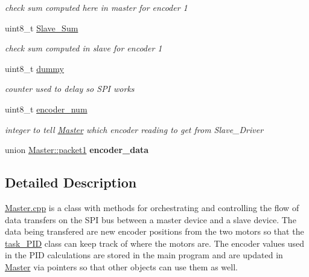 \begin{DoxyCompactItemize}
\begin{DoxyCompactList}\small\item\em check sum computed here in master for encoder 1 \end{DoxyCompactList}\item 
\hypertarget{classMaster_a7231699fbe88393c0d0ff693253f983a}{uint8\-\_\-t \hyperlink{classMaster_a7231699fbe88393c0d0ff693253f983a}{Slave\-\_\-\-Sum}}\label{classMaster_a7231699fbe88393c0d0ff693253f983a}

\begin{DoxyCompactList}\small\item\em check sum computed in slave for encoder 1 \end{DoxyCompactList}\item 
\hypertarget{classMaster_a113205aa4218d33663faeeede6b1e8a9}{uint8\-\_\-t \hyperlink{classMaster_a113205aa4218d33663faeeede6b1e8a9}{dummy}}\label{classMaster_a113205aa4218d33663faeeede6b1e8a9}

\begin{DoxyCompactList}\small\item\em counter used to delay so S\-P\-I works \end{DoxyCompactList}\item 
\hypertarget{classMaster_a1e3e8189d315b4bf7415fe03f4035a10}{uint8\-\_\-t \hyperlink{classMaster_a1e3e8189d315b4bf7415fe03f4035a10}{encoder\-\_\-num}}\label{classMaster_a1e3e8189d315b4bf7415fe03f4035a10}

\begin{DoxyCompactList}\small\item\em integer to tell \hyperlink{classMaster}{Master} which encoder reading to get from Slave\-\_\-\-Driver \end{DoxyCompactList}\item 
\hypertarget{classMaster_a96b723e105507a410c9d0e56398174f0}{union \hyperlink{unionMaster_1_1packet1}{Master\-::packet1} {\bfseries encoder\-\_\-data}}\label{classMaster_a96b723e105507a410c9d0e56398174f0}

\end{DoxyCompactItemize}


\subsection{Detailed Description}
\hyperlink{Master_8cpp}{Master.\-cpp} is a class with methods for orchestrating and controlling the flow of data transfers on the S\-P\-I bus between a master device and a slave device. The data being transfered are new encoder positions from the two motors so that the \hyperlink{classtask__PID}{task\-\_\-\-P\-I\-D} class can keep track of where the motors are. The encoder values used in the P\-I\-D calculations are stored in the main program and are updated in \hyperlink{classMaster}{Master} via pointers so that other objects can use them as well. 

